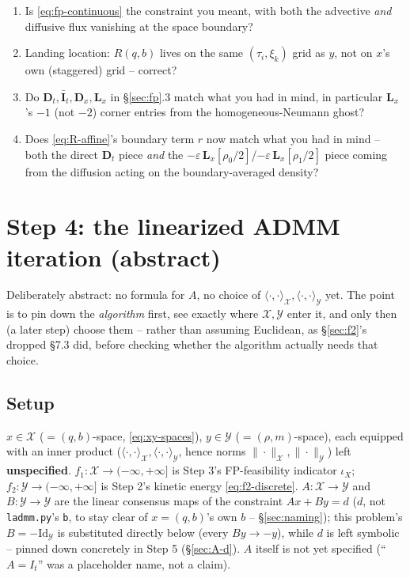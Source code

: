 \documentclass[11pt]{article}
\newcommand{\code}[1]{\texttt{#1}}
\begin{document}
\begin{enumerate}
  \item Is \eqref{eq:fp-continuous} the constraint you meant, with both the advective
        \emph{and} diffusive flux vanishing at the space boundary?
  \item Landing location: $R(q,b)$ lives on the same $(\tau_i,\xi_k)$ grid as $y$, not on
        $x$'s own (staggered) grid -- correct?
  \item Do $\mathbf D_t,\bar{\mathbf I}_t,\mathbf D_x,\mathbf L_x$ in \S\ref{sec:fp}.3 match
        what you had in mind, in particular $\mathbf L_x$'s $-1$ (not $-2$) corner entries
        from the homogeneous-Neumann ghost?
  \item Does \eqref{eq:R-affine}'s boundary term $r$ now match what you had in mind --
        both the direct $\mathbf D_t$ piece \emph{and} the $-\varepsilon\,\mathbf
        L_x[\rho_0/2]$/$-\varepsilon\,\mathbf L_x[\rho_1/2]$ piece coming from the
        diffusion acting on the boundary-averaged density?
\end{enumerate}

\section{Step 4: the linearized ADMM iteration (abstract)}
\label{sec:ladmm}

Deliberately abstract: no formula for $A$, no choice of $\langle\cdot,\cdot\rangle_\mathcal{X},
\langle\cdot,\cdot\rangle_\mathcal{Y}$ yet. The point is to pin down the \emph{algorithm}
first, see exactly where $\mathcal X,\mathcal Y$ enter it, and only then (a later step)
choose them -- rather than assuming Euclidean, as \S\ref{sec:f2}'s dropped \S7.3 did,
before checking whether the algorithm actually needs that choice.

\subsection{Setup}

$x\in\mathcal X$ ($=(q,b)$-space, \eqref{eq:xy-spaces}), $y\in\mathcal Y$ ($=(\rho,m)$-space),
each equipped with an inner product ($\langle\cdot,\cdot\rangle_\mathcal{X},
\langle\cdot,\cdot\rangle_\mathcal{Y}$, hence norms $\|\cdot\|_\mathcal{X},
\|\cdot\|_\mathcal{Y}$) left \textbf{unspecified}. $f_1:\mathcal X\to(-\infty,+\infty]$ is
Step 3's FP-feasibility indicator $\iota_X$; $f_2:\mathcal Y\to(-\infty,+\infty]$ is
Step 2's kinetic energy \eqref{eq:f2-discrete}. $A:\mathcal X\to\mathcal Y$ and
$B:\mathcal Y\to\mathcal Y$ are the linear consensus maps of the constraint $Ax+By=d$
($d$, not \code{ladmm.py}'s \code{b}, to stay clear of $x=(q,b)$'s own $b$ -- \S\ref{sec:naming});
this problem's $B=-\mathrm{Id}_\mathcal{Y}$ is substituted directly below (every
$By\to -y$), while $d$ is left symbolic -- pinned down concretely in Step 5
(\S\ref{sec:A-d}). $A$ itself is not yet specified (``$A=I_t$'' was a placeholder name,
not a claim).
\end{document}
